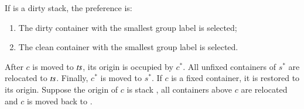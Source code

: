 \documentclass[review,3p,times,authoryear,12pt]{elsarticle}
\begin{document}
If  is a dirty stack, the preference is:
\begin{enumerate}[1.]
\item The dirty container with the smallest group label is selected;
\item The clean container with the smallest group label is selected.
\end{enumerate}
After $c$ is moved to $\id{ts}$, its origin is occupied by $c^*$. All unfixed containers of $s^*$ are relocated to $\id{ts}$. Finally, $c^*$ is moved to $s^*$. If $c$ is a fixed container, it is restored to its origin. Suppose the origin of $c$ is stack , all containers above $c$ are relocated and $c$ is moved back to .
\end{document}
